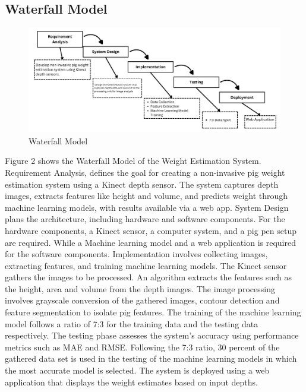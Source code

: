 {\subsection { Waterfall Model}
\begin{figure}[h]
	\centering
	\includegraphics[height=0.3\textheight]{figures/Requirement Analysis (4)}
	\caption{Waterfall Model}
	\label{fig:Waterfall Model}
\end{figure}

Figure 2 shows the Waterfall Model of the Weight Estimation System. Requirement Analysis, defines the goal for creating a non-invasive pig weight estimation system using a Kinect depth sensor. The system captures depth images, extracts features like height and volume, and predicts weight through machine learning models, with results available via a web app. System Design plans the architecture, including hardware and software components. For the hardware components, a Kinect sensor, a computer system, and a pig pen setup are required. While a Machine learning model and a web application is required for the software components. Implementation involves collecting images, extracting features, and training machine learning models. The Kinect sensor gathers the images to be processed. An algorithm extracts the features such as the height, area and volume from the depth images. The image processing involves grayscale conversion of the gathered images, contour detection and feature segmentation to isolate pig features. The training of the machine learning model follows a ratio of 7:3 for the training data and the testing data respectively. The testing phase assesses the system's accuracy using performance metrics such as MAE and RMSE. Following the 7:3 ratio, 30 percent of the gathered data set is used in the testing of the machine learning models in which the most accurate model is selected. The system is deployed using a web application that displays the weight estimates based on input depths.
\newpage
}
